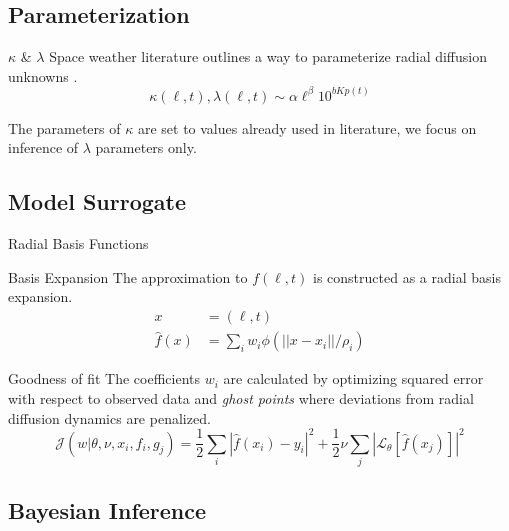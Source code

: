 \documentclass{beamer}
\begin{document}
\subsection{Parameterization}


\begin{frame}{$\kappa$ \& $\lambda$}
  Space weather literature outlines a way to parameterize radial
  diffusion unknowns \cite{JGRA:JGRA15067}.
  \begin{equation*}
    \kappa(\ell, t), \lambda(\ell, t) \sim \alpha \ell^{\beta} 10^{b Kp(t)}
  \end{equation*}

  The parameters of $\kappa$ are set to values already used in
  literature, we focus on inference of $\lambda$ parameters only.
\end{frame}

\subsection{Model Surrogate}

\begin{frame}{Radial Basis Functions}
  \begin{block}{Basis Expansion}
    The approximation to $f(\ell, t)$ is constructed as a radial basis expansion.
    \begin{align*}
      x &= (\ell, t)\\
      \hat{f}(x) &= \sum_{i}{w_{i} \phi(||x - x_{i}||/\rho_{i})}
    \end{align*}
  \end{block}

  \begin{block}{Goodness of fit}
    The coefficients $w_i$ are calculated by optimizing squared error
    with respect to observed data and \emph{ghost points} where
    deviations from radial diffusion dynamics are penalized.
    \begin{equation*}
      \mathcal{J}(w | \theta, \nu, x_{i}, f_{i}, g_{j}) = \frac{1}{2}\sum_{i}{|\hat{f}(x_{i}) -
        y_{i}|^2} + \frac{1}{2} \nu \sum_{j}{|\mathcal{L}_{\theta}[\hat{f}(x_{j})]|^2}
    \end{equation*}
  \end{block}
\end{frame}

\subsection{Bayesian Inference}
\end{document}
